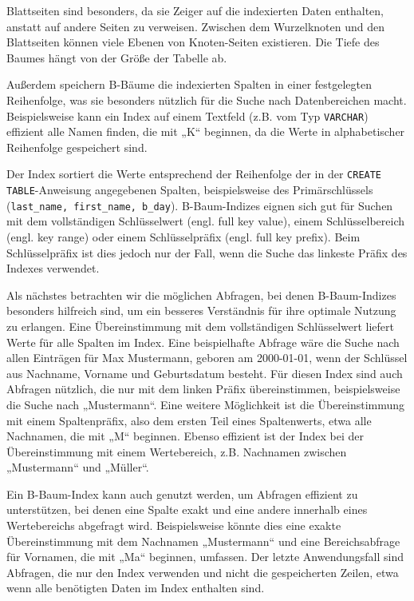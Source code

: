 Blattseiten sind besonders, da sie Zeiger auf die indexierten Daten enthalten, anstatt auf andere Seiten zu verweisen.
Zwischen dem Wurzelknoten und den Blattseiten können viele Ebenen von Knoten-Seiten existieren.
Die Tiefe des Baumes hängt von der Größe der Tabelle ab.

Außerdem speichern B-Bäume die indexierten Spalten in einer festgelegten Reihenfolge, was sie besonders nützlich für die Suche nach Datenbereichen macht.
Beispielsweise kann ein Index auf einem Textfeld (z.B. vom Typ \texttt{VARCHAR}) effizient alle Namen finden, die mit „K“ beginnen, da die Werte in alphabetischer Reihenfolge gespeichert sind.

Der Index sortiert die Werte entsprechend der Reihenfolge der in der \texttt{CREATE TABLE}-Anweisung angegebenen Spalten, beispielsweise des Primärschlüssels (\texttt{last\_name, first\_name, b\_day}).
B-Baum-Indizes eignen sich gut für Suchen mit dem vollständigen Schlüsselwert (engl. full key value), einem Schlüsselbereich (engl. key range) oder einem Schlüsselpräfix (engl. full key prefix).
Beim Schlüsselpräfix ist dies jedoch nur der Fall, wenn die Suche das linkeste Präfix des Indexes verwendet.

Als nächstes betrachten wir die möglichen Abfragen, bei denen B-Baum-Indizes besonders hilfreich sind, um ein besseres Verständnis für ihre optimale Nutzung zu erlangen.
Eine Übereinstimmung mit dem vollständigen Schlüsselwert liefert Werte für alle Spalten im Index.
Eine beispielhafte Abfrage wäre die Suche nach allen Einträgen für Max Mustermann, geboren am 2000-01-01, wenn der Schlüssel aus Nachname, Vorname und Geburtsdatum besteht.
Für diesen Index sind auch Abfragen nützlich, die nur mit dem linken Präfix übereinstimmen, beispielsweise die Suche nach „Mustermann“.
Eine weitere Möglichkeit ist die Übereinstimmung mit einem Spaltenpräfix, also dem ersten Teil eines Spaltenwerts, etwa alle Nachnamen, die mit „M“ beginnen.
Ebenso effizient ist der Index bei der Übereinstimmung mit einem Wertebereich, z.B. Nachnamen zwischen „Mustermann“ und „Müller“.

Ein B-Baum-Index kann auch genutzt werden, um Abfragen effizient zu unterstützen, bei denen eine Spalte exakt und eine andere innerhalb eines Wertebereichs abgefragt wird.
Beispielsweise könnte dies eine exakte Übereinstimmung mit dem Nachnamen „Mustermann“ und eine Bereichsabfrage für Vornamen, die mit „Ma“ beginnen, umfassen.
Der letzte Anwendungsfall sind Abfragen, die nur den Index verwenden und nicht die gespeicherten Zeilen, etwa wenn alle benötigten Daten im Index enthalten sind.

